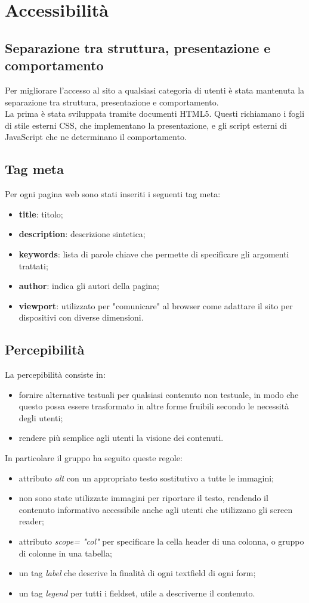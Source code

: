 \section{Accessibilità}
\subsection{Separazione tra struttura, presentazione e comportamento}
Per migliorare l'accesso al sito a qualsiasi categoria di utenti è stata mantenuta la separazione tra struttura, presentazione e comportamento. \\
La prima è stata sviluppata tramite documenti HTML5. Questi richiamano i fogli di stile esterni CSS, che implementano la presentazione, e gli script esterni di JavaScript che ne determinano il comportamento.
\subsection{Tag meta}
Per ogni pagina web sono stati inseriti i seguenti tag meta:
\begin{itemize}
	\item \textbf{title}: titolo;
	\item \textbf{description}: descrizione sintetica;
	\item \textbf{keywords}: lista di parole chiave che permette di specificare gli argomenti trattati;
	\item \textbf{author}: indica gli autori della pagina;
	\item \textbf{viewport}: utilizzato per "comunicare" al browser come adattare il sito per dispositivi con diverse dimensioni.
\end{itemize}


\subsection{Percepibilità}
La percepibilità consiste in: 
	\begin{itemize}
		\item fornire alternative testuali per qualsiasi contenuto non testuale, in modo che questo possa essere trasformato in altre forme fruibili secondo le necessità degli utenti;
		\item rendere più semplice agli utenti la visione dei contenuti.
	\end{itemize}
	In particolare il gruppo ha seguito queste regole:
	\begin{itemize}
		\item attributo \textit{alt} con un appropriato testo sostitutivo a tutte le immagini;
		\item non sono state utilizzate immagini per riportare il testo, rendendo il contenuto informativo accessibile anche agli utenti che utilizzano gli screen reader;
		\item attributo \textit{scope= "col"} per specificare la cella header di una colonna, o gruppo di colonne in una tabella;
		\item un tag \textit{label} che descrive la finalità di ogni textfield di ogni form;
		\item un tag \textit{legend} per tutti i fieldset, utile a descriverne il contenuto.
	\end{itemize}
